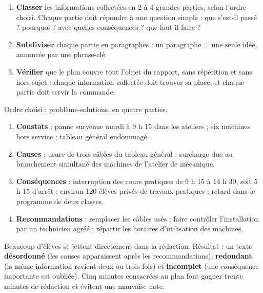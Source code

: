 \documentclass[11pt]{article}
\begin{document}
\begin{methode}
\begin{enumerate}
\item \textbf{Classer} les informations collectées en 2 à 4 grandes parties, selon l'ordre choisi. Chaque partie doit répondre à une question simple : que s'est-il passé ? pourquoi ? avec quelles conséquences ? que faut-il faire ?
\item \textbf{Subdiviser} chaque partie en paragraphes : un paragraphe = une seule idée, annoncée par une phrase-clé.
\item \textbf{Vérifier} que le plan couvre tout l'objet du rapport, sans répétition et sans hors-sujet : chaque information collectée doit trouver sa place, et chaque partie doit servir la commande.
\end{enumerate}
\end{methode}

\begin{exemplebox}
Ordre choisi : problème-solutions, en quatre parties.
\begin{enumerate}
\item \textbf{Constats} : panne survenue mardi à 9 h 15 dans les ateliers ; six machines hors service ; tableau général endommagé.
\item \textbf{Causes} : usure de trois câbles du tableau général ; surcharge due au branchement simultané des machines de l'atelier de mécanique.
\item \textbf{Conséquences} : interruption des cours pratiques de 9 h 15 à 14 h 30, soit 5 h 15 d'arrêt ; environ 120 élèves privés de travaux pratiques ; retard dans le programme de deux classes.
\item \textbf{Recommandations} : remplacer les câbles usés ; faire contrôler l'installation par un technicien agréé ; répartir les horaires d'utilisation des machines.
\end{enumerate}
\end{exemplebox}

\begin{attention}
Beaucoup d'élèves se jettent directement dans la rédaction. Résultat : un texte \textbf{désordonné} (les causes apparaissent après les recommandations), \textbf{redondant} (la même information revient deux ou trois fois) et \textbf{incomplet} (une conséquence importante est oubliée). Cinq minutes consacrées au plan font gagner trente minutes de rédaction et évitent une mauvaise note.
\end{attention}
\end{document}

